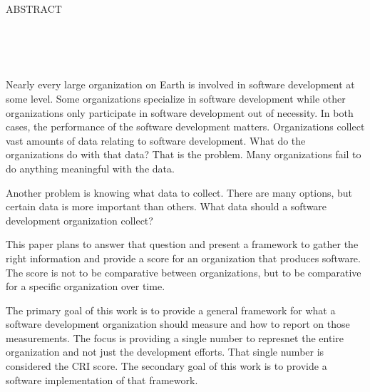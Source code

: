 \documentclass[SDSUThesis.tex]{subfiles}
\begin{document}
\newpage
\doublespacing

\begin{center}
ABSTRACT\\

\yourtitle \\
\yourname \\
\number\year\\
\end{center}

\par
Nearly every large organization on Earth is involved in software development at some level.  Some organizations
specialize in software development while other organizations only participate in software development out of
necessity. In both cases, the performance of the software development matters.  Organizations collect
vast amounts of data relating to software development.  What do the organizations do with that data? 
That is the problem.  Many organizations fail to do anything meaningful with the data.  

Another problem is knowing what data to collect.  There are many options, but certain data is more important than
others.  What data should a software development organization collect?

This paper plans to answer that question and present a framework to gather the 
right information and provide a score for an organization that
produces software.  The score is not to be comparative between organizations, but to be comparative for a specific
organization over time.  

The primary goal of this work is to provide a general framework for what a software development organization
should measure and how to report on those measurements.  The focus is providing a single number
to represnet the entire
organization and not just the development efforts.  That single number is considered the CRI score. The secondary goal of this work is to provide
a software implementation of that framework.
\end{document}
